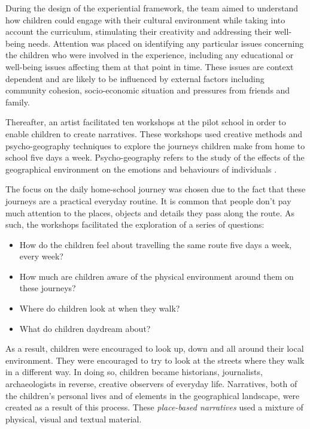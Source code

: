 \documentclass[acmlarge,screen,dvipsnames]{acmart}
\begin{document}

During the design of the experiential framework, the team aimed to understand how children
could engage with their cultural environment while taking into account the 
curriculum, stimulating their creativity and addressing their well-being
needs. Attention was placed on identifying any particular issues
concerning the children who were involved in the experience, including any
educational or well-being issues affecting them at that point
in time. These issues are context dependent and are likely to be influenced by
external factors including community cohesion, socio-economic situation and
pressures from friends and family.

Thereafter, an artist facilitated ten workshops at the pilot school in order to
enable children to create narratives. These workshops used creative methods
and psycho-geography techniques to explore the journeys children make from home
to school five days a week. Psycho-geography refers to the study of the effects
of the geographical environment on the emotions and behaviours of individuals
\cite{coverley2006psychogeography}. 

The focus on the daily home-school journey was chosen due to the fact that
these journeys are a practical everyday routine. It is common that people
don't pay much attention to the places, objects and details they pass along
the route. As such, the workshops facilitated the exploration of a series of
questions:

\begin{itemize} 
  \item How do the children feel about travelling the same route five days a week, every week?   
  \item How much are children aware of the physical environment around them on these journeys? 
  \item Where do children look at when they walk? 
  \item What do children daydream about? 
\end{itemize}

As a result, children were encouraged to look up, down and all around their
local environment. They were encouraged to try to look at the streets where
they walk in a different way. In doing so, children became historians,
journalists, archaeologists in reverse, creative observers of everyday life.
Narratives, both of the children's personal lives and of elements in the
geographical landscape, were created as a result of this process. These
\emph{place-based narratives} used a mixture of physical, visual and textual
material. 
\end{document}
